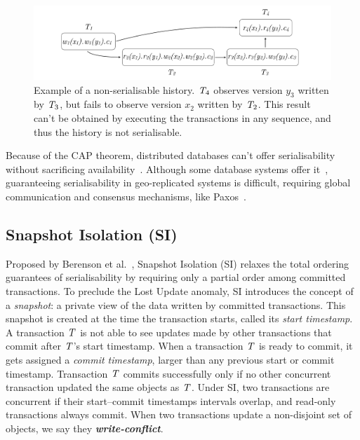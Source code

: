 \begin{figure}[h]
  \centering
  \vspace{-0.3cm}
  \includegraphics[width=\textwidth]{figures/non_ser_hist.pdf}
  \vspace{-1cm}
  \caption{Example of a non-serialisable history. $\mathit{T}_4$ observes version $y_3$ written by $\mathit{T}_3$, but fails to observe version $x_2$ written by $\mathit{T}_2$. This result can't be obtained by executing the transactions in any sequence, and thus the history is not serialisable.}
  \label{fig:non_ser_history}
\end{figure}

Because of the CAP theorem, distributed databases can't offer serialisability without sacrificing availability~\citep{cap-brewer, cap-theorem}. Although some database systems offer it~\citep{google_spanner}, guaranteeing serialisability in geo-replicated systems is difficult, requiring global communication and consensus mechanisms, like Paxos~\citep{lamport_paxos}.

\subsection{Snapshot Isolation (SI)}
\label{sect:si}

Proposed by Berenson et al.~\citep{sql-critique}, Snapshot Isolation (SI) relaxes the total ordering guarantees of serialisability by requiring only a partial order among committed transactions. To preclude the Lost Update anomaly, SI introduces the concept of a \emph{snapshot}: a private view of the data written by committed transactions. This snapshot is created at the time the transaction starts, called its \emph{start timestamp}. A transaction $\mathit{T}$ is not able to see updates made by other transactions that commit after $\mathit{T}$'s start timestamp. When a transaction $\mathit{T}$ is ready to commit, it gets assigned a \emph{commit timestamp}, larger than any previous start or commit timestamp. Transaction $\mathit{T}$ commits successfully only if no other concurrent transaction updated the same objects as $\mathit{T}$. Under SI, two transactions are concurrent if their start--commit timestamps intervals overlap, and read-only transactions always commit. When two transactions update a non-disjoint set of objects, we say they \textbf{\em write-conflict}.

